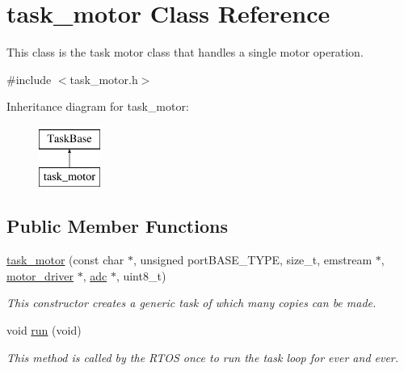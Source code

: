 \hypertarget{classtask__motor}{\section{task\-\_\-motor Class Reference}
\label{classtask__motor}
}


This class is the task motor class that handles a single motor operation.  




{\ttfamily \#include $<$task\-\_\-motor.\-h$>$}

Inheritance diagram for task\-\_\-motor\-:\begin{figure}[H]
\begin{center}
\leavevmode
\includegraphics[height=2.000000cm]{classtask__motor}
\end{center}
\end{figure}
\subsection*{Public Member Functions}
\begin{DoxyCompactItemize}
\item 
\hyperlink{classtask__motor_aefd82ba00ba8755bad9fdb516719b3d5}{task\-\_\-motor} (const char $\ast$, unsigned port\-B\-A\-S\-E\-\_\-\-T\-Y\-P\-E, size\-\_\-t, emstream $\ast$, \hyperlink{classmotor__driver}{motor\-\_\-driver} $\ast$, \hyperlink{classadc}{adc} $\ast$, uint8\-\_\-t)
\begin{DoxyCompactList}\small\item\em This constructor creates a generic task of which many copies can be made. \end{DoxyCompactList}\item 
void \hyperlink{classtask__motor_a895a075ec470c9d5a07b8959de06aacd}{run} (void)
\begin{DoxyCompactList}\small\item\em This method is called by the R\-T\-O\-S once to run the task loop for ever and ever. \end{DoxyCompactList}\end{DoxyCompactItemize}
